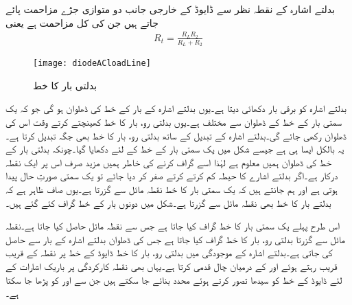 بدلتے اشارہ کے نقطہ نظر سے ڈایوڈ کے خارجی جانب دو متوازی جڑے مزاحمت پائے جاتے ہیں جن کی کل مزاحمت   ہے یعنی
\begin{align}
R_t= \frac{R_L R_2}{R_L+R_2}
\end{align}
%
\begin{figure}
\centering
\texttt{[image: diodeACloadLine]}
\caption{بدلتی بار کا خط}
\label{شکل_ڈایوڈ_بدلتا_بار_کا_خط}
\end{figure}
بدلتے اشارہ کو  برقی بار دکھائی دیتا ہے۔یوں بدلتے اشارہ کے بار کے خط کی ڈھلوان  ہو گی جو کہ یک سمتی بار کے خط کے ڈھلوان سے مختلف ہے۔یوں بدلتی رو، بار کا خط کھینچتے کرتے وقت اس کی ڈھلوان  رکھی جائے گی۔بدلتے اشارہ کے تبدیل کے ساتھ  بدلتی رو، بار کا خط بھی جگہ تبدیل کرتا ہے۔یہ بالکل ایسا ہی ہے جیسے شکل   میں یک سمتی بار کے خط کے لئے دکھایا گیا۔چونکہ بدلتی بار کے خط کی ڈھلوان ہمیں معلوم ہے لہٰذا اسے گراف کرنے کی خاطر ہمیں مزید صرف اس پر ایک نقطہ درکار ہے۔اگر بدلتے اشارے کا حیطہ کم کرتے کرتے صفر کر دیا جائے تو یک سمتی صورتِ حال پیدا ہوتی ہے اور ہم جانتے ہیں کہ یک سمتی بار کا خط نقطہ مائل سے گزرتا ہے۔یوں صاف ظاہر ہے کہ بدلتے بار کا خط بھی نقطہ مائل سے گزرتا ہے۔شکل  میں دونوں بار کے خط گراف کئے گئے ہیں۔

اس طرح پہلے یک سمتی بار کا خط گراف کیا جاتا ہے جس سے نقطہ مائل حاصل کیا جاتا ہے۔نقطہ مائل سے گزرتا بدلتی رو، بار کا خط گراف کیا جاتا ہے جس کی ڈھلوان بدلتے اشارہ کے بار سے حاصل کی جاتی ہے۔بدلتے اشارہ کے موجودگی میں بدلتی رو، بار کا خط ڈایوڈ کے خط پر نقطہ  کے قریب قریب رہتے ہوئے   اور  کے درمیان چال قدمی کرتا ہے۔یہاں بھی نقطہ کارکردگی پر باریک اشارات کے لئے ڈایوڈ کے خط کو سیدھا تصور کرتے ہوئے محدد  بنائے جا سکتے ہیں جن سے اور  کو پڑھا جا سکتا ہے۔

